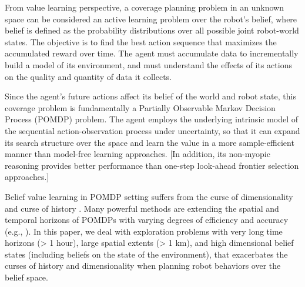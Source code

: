 \documentclass[letterpaper]{article} %
\newcommand{\phdone}[1]{} %
\begin{document}


From value learning perspective, a coverage planning problem in an unknown space can be considered an active learning problem over the robot's belief, where belief is defined as the probability distributions over all possible joint robot-world states.
%
The objective is to find the best action sequence that maximizes the accumulated reward over time.  The agent must accumulate data to incrementally build a model of its environment, and must understand the effects of its actions on the quality and quantity of data it collects.

\phdone{Problem description--POMDP perspective}
Since the agent's future actions affect its belief of the world and robot state, this coverage problem is fundamentally a Partially Observable Markov Decision Process (POMDP) problem.
The agent employs the underlying intrinsic model of the sequential action-observation process under uncertainty, so that it can %
expand its search structure over the space and learn the value in a more sample-efficient manner than model-free learning approaches.
[In addition, its non-myopic reasoning provides better performance than one-step look-ahead frontier selection approaches.]

\phdone{Gap in the state-of-the-art}
Belief value learning in POMDP setting suffers from the curse of dimensionality \cite{KLC98} and curse of history \cite{Pineau03}. Many powerful methods are extending the spatial and temporal horizons of POMDPs with varying degrees of efficiency and accuracy (e.g., \cite{silver2010monte,somani2013despot,bonet1998learning,kim2019pomhdp}). In this paper, we deal with exploration problems with very long time horizons (> 1 hour), large spatial extents (> 1 km), and high dimensional belief states (including beliefs on the state of the environment), that exacerbates the curses of history and dimensionality when planning robot behaviors over the belief space.
%
\end{document}
